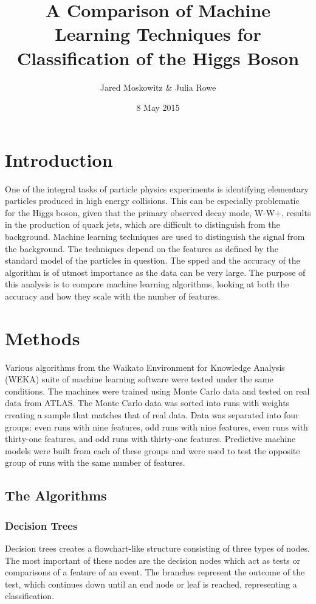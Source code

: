 \documentclass[aps, reprint, amsmath, amssymb]{revtex4-1}
\begin{document}
\title{A Comparison of Machine Learning Techniques for Classification of the Higgs Boson}
\author{Jared Moskowitz \& Julia Rowe}
\date{8 May 2015}

\maketitle

\section{Introduction}
One of the integral tasks of particle physics experiments is identifying elementary particles produced in high energy collisions. This can be especially problematic for the Higgs boson, given that the primary observed decay mode, W-W+, results in the production of quark jets, which are difficult to distinguish from the background. Machine learning techniques are used to distinguish the signal from the background.  The techniques depend on the features as defined by the standard model of the particles in question.  The spped and the accuracy of the algorithm is of utmost importance as the data can be very large.  The purpose of this analysis is to compare machine learning algorithms, looking at both the accuracy and how they scale with the number of features.  

\section{Methods}
Various algorithms from the Waikato Environment for Knowledge Analysis (WEKA) suite of machine learning software were tested under the same conditions.  The machines were trained using Monte Carlo data and tested on real data from ATLAS.  The Monte Carlo data was sorted into runs with weights creating a sample that matches that of real data.  Data was separated into four groups: even runs with nine features, odd runs with nine features, even runs with thirty-one features, and odd runs with thirty-one features.  Predictive machine models were built from each of these groups and were used to test the opposite group of runs with the same number of features.  

\subsection{The Algorithms}
\subsubsection{Decision Trees}
Decision trees creates a flowchart-like structure consisting of three types of nodes. The most important of these nodes are the decision nodes which act as tests or comparisons of a feature of an event.  The branches represent the outcome of the test, which continues down until an end node or leaf is reached, representing a classification.  
\end{document}
